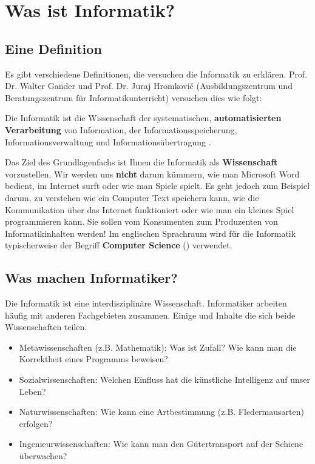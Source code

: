 
\toggletrue{image}
\togglefalse{imagehover}

\chapter{Was ist Informatik?}
\label{chapter-was-ist-informatik}

\section{Eine Definition}

Es gibt verschiedene Definitionen, die versuchen die Informatik zu erklären. Prof. Dr. Walter Gander und Prof. Dr. Juraj Hromkovič (Ausbildungszentrum und Beratungszentrum für Informatikunterricht) versuchen
dies wie folgt:

\begin{definition}[Informatik]
Die Informatik ist die Wissenschaft der systematischen, \textbf{automatisierten Verarbeitung} von Information, der Informationsspeicherung, Informationsverwaltung und Informationsübertragung \cite{def-informatik}.
\end{definition}

Das Ziel des Grundlagenfachs ist Ihnen die Informatik als \textbf{Wissenschaft} vorzustellen. Wir werden uns \textbf{nicht} darum kümmern, wie man Microsoft Word bedient, im Internet surft oder wie man Spiele spielt. Es geht jedoch zum Beispiel darum, zu verstehen wie ein Computer Text speichern kann, wie die Kommunikation über das Internet funktioniert oder wie man ein kleines Spiel programmieren kann. Sie sollen vom Konsumenten zum Produzenten von Informatikinhalten werden! Im englischen Sprachraum wird für die Informatik typischerweise der Begriff \textbf{Computer Science} () verwendet.

\section{Was machen Informatiker?}

Die Informatik ist eine interdisziplinäre Wissenschaft. Informatiker arbeiten häufig mit anderen Fachgebieten zusammen. Einige  und Inhalte die sich beide Wissenschaften teilen.

\begin{itemize}
\item Metawissenschaften (z.B. Mathematik): Was ist Zufall? Wie kann man die Korrektheit eines Programms beweisen?
\item Sozialwissenschaften: Welchen Einfluss hat die künstliche Intelligenz auf unser Leben?
\item Naturwissenschaften: Wie kann eine Artbestimmung (z.B. Fledermausarten) erfolgen?
\item Ingenieurwissenschaften: Wie kann man den Gütertransport auf der Schiene überwachen?
\end{itemize}

